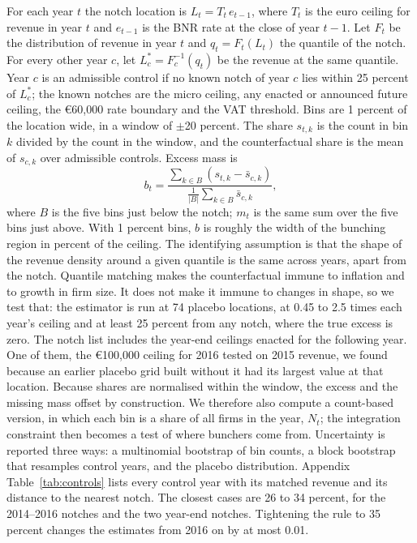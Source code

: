 \documentclass[12pt]{article}
\begin{document}
For each year $t$ the notch location is $L_t = T_t \, e_{t-1}$, where $T_t$ is the euro ceiling for revenue in year $t$ and $e_{t-1}$ is the BNR rate at the close of year $t-1$. Let $F_t$ be the distribution of revenue in year $t$ and $q_t = F_t(L_t)$ the quantile of the notch. For every other year $c$, let $L^*_c = F_c^{-1}(q_t)$ be the revenue at the same quantile. Year $c$ is an admissible control if no known notch of year $c$ lies within 25 percent of $L^*_c$; the known notches are the micro ceiling, any enacted or announced future ceiling, the \euro{}60,000 rate boundary and the VAT threshold. Bins are 1 percent of the location wide, in a window of $\pm$20 percent. The share $s_{t,k}$ is the count in bin $k$ divided by the count in the window, and the counterfactual share is the mean of $s_{c,k}$ over admissible controls. Excess mass is
\begin{equation}
b_t = \frac{\sum_{k \in B} \left( s_{t,k} - \bar{s}_{c,k} \right)}{\frac{1}{|B|}\sum_{k\in B} \bar{s}_{c,k}},
\end{equation}
where $B$ is the five bins just below the notch; $m_t$ is the same sum over the five bins just above. With 1 percent bins, $b$ is roughly the width of the bunching region in percent of the ceiling. The identifying assumption is that the shape of the revenue density around a given quantile is the same across years, apart from the notch. Quantile matching makes the counterfactual immune to inflation and to growth in firm size. It does not make it immune to changes in shape, so we test that: the estimator is run at 74 placebo locations, at 0.45 to 2.5 times each year's ceiling and at least 25 percent from any notch, where the true excess is zero. The notch list includes the year-end ceilings enacted for the following year. One of them, the \euro{}100,000 ceiling for 2016 tested on 2015 revenue, we found because an earlier placebo grid built without it had its largest value at that location. Because shares are normalised within the window, the excess and the missing mass offset by construction. We therefore also compute a count-based version, in which each bin is a share of all firms in the year, $N_t$; the integration constraint then becomes a test of where bunchers come from. Uncertainty is reported three ways: a multinomial bootstrap of bin counts, a block bootstrap that resamples control years, and the placebo distribution. Appendix Table~\ref{tab:controls} lists every control year with its matched revenue and its distance to the nearest notch. The closest cases are 26 to 34 percent, for the 2014--2016 notches and the two year-end notches. Tightening the rule to 35 percent changes the estimates from 2016 on by at most 0.01.
\end{document}
